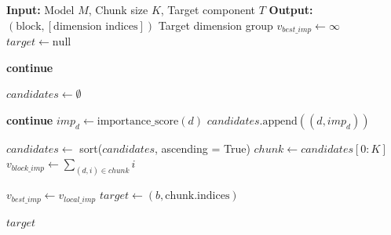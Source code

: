 \begin{algorithm}[H]
\caption{Selezione del gruppo di dimensioni ottimale per il taglio}
\label{alg:find_target_gen}
\begin{algorithmic}[1]
    \State \textbf{Input:} Model $M$, Chunk size $K$, Target component $T$
    \State \textbf{Output:} $(\text{block}, [\text{dimension indices}])$ Target dimension group
    \State $v_{best\_imp} \gets \infty$
    \State $target \gets \text{null}$
    
            \State \textbf{continue}
        \EndIf
        
        \State $candidates \gets \emptyset$
        
                \State \textbf{continue}
            \EndIf
            \State $imp_d \gets \text{importance\_score}(d)$
            \State $candidates.\text{append}((d, imp_d))$
        \EndFor
        
        \State $candidates \gets$ sort($candidates$, ascending = True) 
        \State $chunk \gets candidates[0 : K]$
        \State $v_{block\_imp} \gets \sum_{(d, i) \in chunk} i$
        
            \State $v_{best\_imp} \gets v_{local\_imp}$
            \State $target \gets (b, \text{chunk.indices})$
        \EndIf
    \EndFor
    
    \State \Return $target$
\end{algorithmic}
\end{algorithm}
